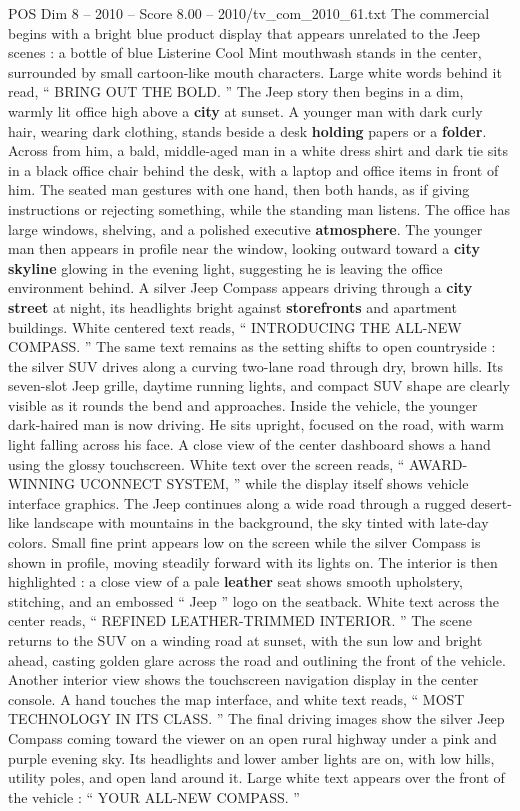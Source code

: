 \begin{textsample}{POS Dim 8 – 2010 – Score 8.00 – 2010/tv\_com\_2010\_61.txt}  \label{ex:f8_pos_022}
The commercial begins with a bright blue product display that appears unrelated to the Jeep scenes : a bottle of blue Listerine Cool Mint mouthwash stands in the center, surrounded by small cartoon-like mouth characters.
Large white words behind it read, “ BRING OUT THE BOLD. ” The Jeep story then begins in a dim, warmly lit office high above a \textbf{city} at sunset.
A younger man with dark curly hair, wearing dark clothing, stands beside a desk \textbf{holding} papers or a \textbf{folder}.
Across from him, a bald, middle-aged man in a white dress shirt and dark tie sits in a black office chair behind the desk, with a laptop and office items in front of him.
The seated man gestures with one hand, then both hands, as if giving instructions or rejecting something, while the standing man listens.
The office has large windows, shelving, and a polished executive \textbf{atmosphere}.
The younger man then appears in profile near the window, looking outward toward a \textbf{city} \textbf{skyline} glowing in the evening light, suggesting he is leaving the office environment behind.
A silver Jeep Compass appears driving through a \textbf{city} \textbf{street} at night, its headlights bright against \textbf{storefronts} and apartment buildings.
White centered text reads, “ INTRODUCING THE ALL-NEW COMPASS. ” The same text remains as the setting shifts to open countryside : the silver SUV drives along a curving two-lane road through dry, brown hills.
Its seven-slot Jeep grille, daytime running lights, and compact SUV shape are clearly visible as it rounds the bend and approaches.
Inside the vehicle, the younger dark-haired man is now driving.
He sits upright, focused on the road, with warm light falling across his face.
A close view of the center dashboard shows a hand using the glossy touchscreen.
White text over the screen reads, “ AWARD-WINNING UCONNECT SYSTEM, ” while the display itself shows vehicle interface graphics.
The Jeep continues along a wide road through a rugged desert-like landscape with mountains in the background, the sky tinted with late-day colors.
Small fine print appears low on the screen while the silver Compass is shown in profile, moving steadily forward with its lights on.
The interior is then highlighted : a close view of a pale \textbf{leather} seat shows smooth upholstery, stitching, and an embossed “ Jeep ” logo on the seatback.
White text across the center reads, “ REFINED LEATHER-TRIMMED INTERIOR. ” The scene returns to the SUV on a winding road at sunset, with the sun low and bright ahead, casting golden glare across the road and outlining the front of the vehicle.
Another interior view shows the touchscreen navigation display in the center console.
A hand touches the map interface, and white text reads, “ MOST TECHNOLOGY IN ITS CLASS. ” The final driving images show the silver Jeep Compass coming toward the viewer on an open rural highway under a pink and purple evening sky.
Its headlights and lower amber lights are on, with low hills, utility poles, and open land around it.
Large white text appears over the front of the vehicle : “ YOUR ALL-NEW COMPASS. ”

\end{textsample}
